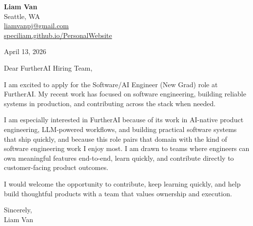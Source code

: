 \documentclass[letterpaper,11pt]{article}
\begin{document}
\begin{flushleft}
\textbf{\Large Liam Van} \\
Seattle, WA \\
\href{mailto:liamvanpj@gmail.com}{liamvanpj@gmail.com} \\
\href{https://speciliam.github.io/PersonalWebsite}{speciliam.github.io/PersonalWebsite}
\end{flushleft}

April 13, 2026

\noindent Dear FurtherAI Hiring Team,

\noindent I am excited to apply for the Software/AI Engineer (New Grad) role at FurtherAI. My recent work has focused on software engineering, building reliable systems in production, and contributing across the stack when needed.

\noindent I am especially interested in FurtherAI because of its work in AI-native product engineering, LLM-powered workflows, and building practical software systems that ship quickly, and because this role pairs that domain with the kind of software engineering work I enjoy most. I am drawn to teams where engineers can own meaningful features end-to-end, learn quickly, and contribute directly to customer-facing product outcomes.

\noindent I would welcome the opportunity to contribute, keep learning quickly, and help build thoughtful products with a team that values ownership and execution.

\noindent Sincerely, \\
Liam Van
\end{document}
